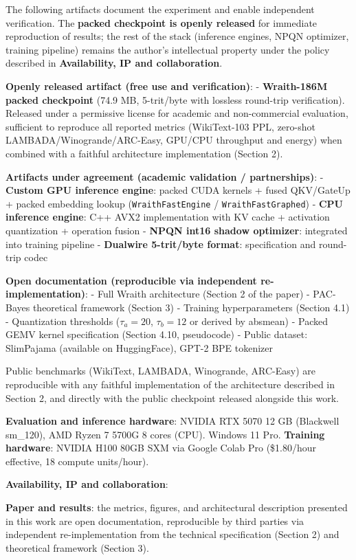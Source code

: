 The following artifacts document the experiment and enable independent
verification. The \textbf{packed checkpoint is openly released} for
immediate reproduction of results; the rest of the stack (inference
engines, NPQN optimizer, training pipeline) remains the author's
intellectual property under the policy described in
\textbf{Availability, IP and collaboration}.

\textbf{Openly released artifact (free use and verification)}: -
\textbf{Wraith-186M packed checkpoint} (74.9 MB, 5-trit/byte with
lossless round-trip verification). Released under a permissive license
for academic and non-commercial evaluation, sufficient to reproduce all
reported metrics (WikiText-103 PPL, zero-shot
LAMBADA/Winogrande/ARC-Easy, GPU/CPU throughput and energy) when
combined with a faithful architecture implementation (Section 2).

\textbf{Artifacts under agreement (academic validation / partnerships)}:
- \textbf{Custom GPU inference engine}: packed CUDA kernels + fused
QKV/GateUp + packed embedding lookup (\texttt{WraithFastEngine} /
\texttt{WraithFastGraphed}) - \textbf{CPU inference engine}: C++ AVX2
implementation with KV cache + activation quantization + operation
fusion - \textbf{NPQN int16 shadow optimizer}: integrated into training
pipeline - \textbf{Dualwire 5-trit/byte format}: specification and
round-trip codec

\textbf{Open documentation (reproducible via independent
re-implementation)}: - Full Wraith architecture (Section 2 of the paper)
- PAC-Bayes theoretical framework (Section 3) - Training hyperparameters
(Section 4.1) - Quantization thresholds (\(\tau_a = 20\),
\(\tau_b = 12\) or derived by absmean) - Packed GEMV kernel
specification (Section 4.10, pseudocode) - Public dataset: SlimPajama
(available on HuggingFace), GPT-2 BPE tokenizer

Public benchmarks (WikiText, LAMBADA, Winogrande, ARC-Easy) are
reproducible with any faithful implementation of the architecture
described in Section 2, and directly with the public checkpoint released
alongside this work.

\textbf{Evaluation and inference hardware}: NVIDIA RTX 5070 12 GB
(Blackwell sm\_120), AMD Ryzen 7 5700G 8 cores (CPU). Windows 11 Pro.
\textbf{Training hardware}: NVIDIA H100 80GB SXM via Google Colab Pro
(\$1.80/hour effective, 18 compute units/hour).

\textbf{Availability, IP and collaboration}:

\textbf{Paper and results}: the metrics, figures, and architectural
description presented in this work are open documentation, reproducible
by third parties via independent re-implementation from the technical
specification (Section 2) and theoretical framework (Section 3).

